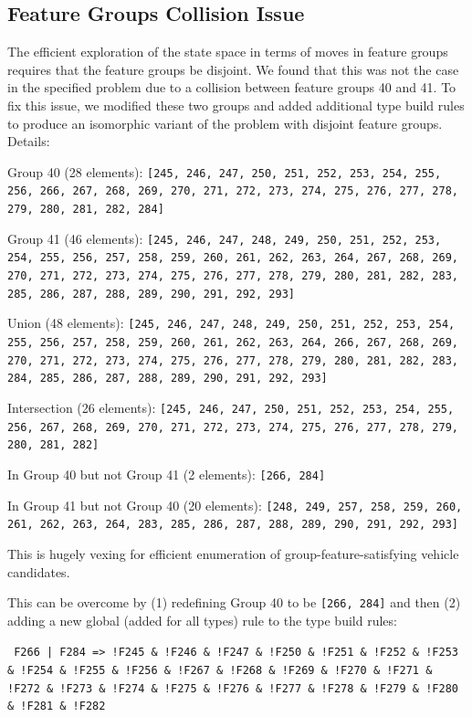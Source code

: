 \documentclass[aps,pra,twocolumn,superscriptaddress,groupedaddress]{revtex4}  %
\begin{document}
\subsection{Feature Groups Collision Issue}

The efficient exploration of the state space in terms of moves in feature groups
requires that the feature groups be disjoint. We found that this was not the
case in the specified problem due to a collision between feature groups 40 and
41. To fix this issue, we modified these two groups and added additional type
build rules to produce an isomorphic variant of the problem with disjoint
feature groups. Details:

Group 40 (28 elements): \texttt{[245, 246, 247, 250, 251, 252, 253, 254, 255,
256, 266, 267, 268, 269, 270, 271, 272, 273, 274, 275, 276, 277, 278, 279, 280,
281, 282, 284]}

Group 41 (46 elements): \texttt{[245, 246, 247, 248, 249, 250, 251, 252, 253,
254, 255, 256, 257, 258, 259, 260, 261, 262, 263, 264, 267, 268, 269, 270, 271,
272, 273, 274, 275, 276, 277, 278, 279, 280, 281, 282, 283, 285, 286, 287, 288,
289, 290, 291, 292, 293]}

Union (48 elements): \texttt{[245, 246, 247, 248, 249, 250, 251, 252, 253, 254,
255, 256, 257, 258, 259, 260, 261, 262, 263, 264, 266, 267, 268, 269, 270, 271,
272, 273, 274, 275, 276, 277, 278, 279, 280, 281, 282, 283, 284, 285, 286, 287,
288, 289, 290, 291, 292, 293]}

Intersection (26 elements): \texttt{[245, 246, 247, 250, 251, 252, 253, 254,
255, 256, 267, 268, 269, 270, 271, 272, 273, 274, 275, 276, 277, 278, 279, 280,
281, 282]}

In Group 40 but not Group 41 (2 elements): \texttt{[266, 284]}

In Group 41 but not Group 40 (20 elements): \texttt{[248, 249, 257, 258, 259,
260, 261, 262, 263, 264, 283, 285, 286, 287, 288, 289, 290, 291, 292, 293]}

This is hugely vexing for efficient enumeration of group-feature-satisfying
vehicle candidates.

This can be overcome by (1) redefining Group 40 to be \texttt{[266, 284]} and
then (2) adding a new global (added for all types) rule to the type build rules:

\texttt{ F266 | F284 => !F245 \& !F246 \& !F247 \& !F250 \& !F251 \& !F252 \& !F253 \&
!F254 \& !F255 \& !F256 \& !F267 \& !F268 \& !F269 \& !F270 \& !F271 \& !F272 \& !F273 \&
!F274 \& !F275 \& !F276 \& !F277 \& !F278 \& !F279 \& !F280 \& !F281 \& !F282}
\end{document}
